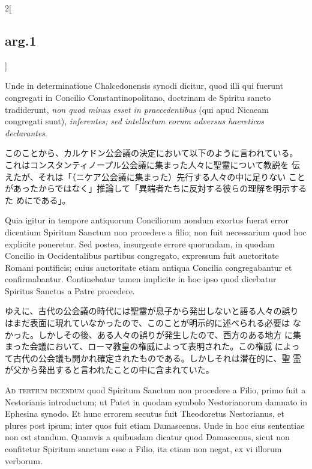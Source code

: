 \documentclass[paper=a4paper,fontsize=10pt,jafontsize=9pt,titlepage]{jlreq}
\begin{document}
\begin{paracol}{2}[\subsection{arg.1}]
\switchcolumn*

Unde in
determinatione Chalcedonensis synodi dicitur, quod illi qui fuerunt
congregati in Concilio Constantinopolitano, doctrinam de  Spiritu
sancto tradiderunt, {\itshape non quod minus esset in praecedentibus} (qui apud
Nicaeam congregati sunt), {\itshape inferentes; sed intellectum eorum adversus
haereticos declarantes}.

\switchcolumn

このことから、カルケドン公会議の決定において以下のように言われている。
これはコンスタンティノープル公会議に集まった人々に聖霊について教説を
伝えたが、それは「（ニケア公会議に集まった）先行する人々の中に足りない
ことがあったからではなく」推論して「異端者たちに反対する彼らの理解を明示するた
めにである」。

\switchcolumn*

Quia igitur in tempore antiquorum Conciliorum
nondum exortus fuerat error dicentium  Spiritum Sanctum non procedere a
filio; non fuit necessarium quod hoc explicite poneretur. Sed postea,
insurgente errore quorundam, in quodam Concilio in Occidentalibus
partibus congregato, expressum fuit auctoritate Romani pontificis;
cuius auctoritate etiam antiqua Concilia congregabantur et
confirmabantur. Continebatur tamen implicite in hoc ipso quod
dicebatur Spiritus Sanctus a Patre procedere.

\switchcolumn

ゆえに、古代の公会議の時代には聖霊が息子から発出しないと語る人々の誤り
 はまだ表面に現れていなかったので、このことが明示的に述べられる必要は
 なかった。しかしその後、ある人々の誤りが発生したので、西方のある地方
 に集まった会議において、ローマ教皇の権威によって表明された。この権威
 によって古代の公会議も開かれ確定されたものである。しかしそれは潜在的に、聖
 霊が父から発出すると言われたことの中に含まれていた。

\switchcolumn*[\subsection{ad.3}]

{\scshape Ad tertium dicendum} quod  Spiritum Sanctum non procedere a Filio, primo
fuit a Nestorianis introductum; ut Patet in quodam symbolo
Nestorianorum damnato in Ephesina synodo. Et hunc errorem secutus fuit
Theodoretus Nestorianus, et plures post ipsum; inter quos fuit etiam
Damascenus. Unde in hoc eius sententiae non est standum. Quamvis a
quibusdam dicatur quod Damascenus, sicut non confitetur  Spiritum
sanctum esse a Filio, ita etiam non negat, ex vi illorum verborum.


\end{paracol}
\end{document}

